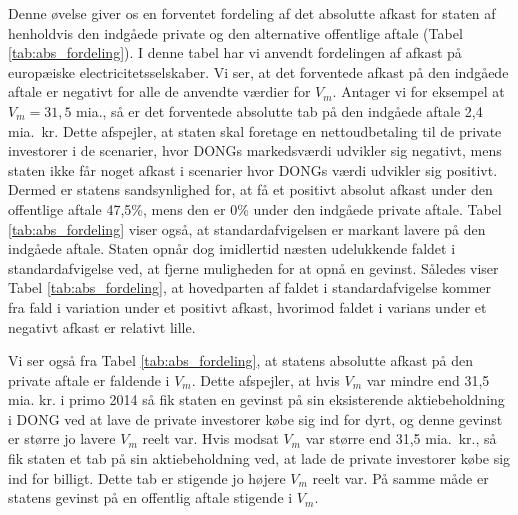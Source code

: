 \documentclass{article}
\begin{document}
Denne øvelse giver os en forventet fordeling af det absolutte afkast for staten af henholdvis den indgåede private og den alternative offentlige aftale (Tabel \ref{tab:abs_fordeling}). I denne tabel har vi anvendt fordelingen af afkast på europæiske electricitetsselskaber. Vi ser, at det forventede afkast på den indgåede aftale er negativt for alle de anvendte værdier for $V_m$. Antager vi for eksempel at $V_m=31{,}5$ mia., så er det forventede absolutte tab på den indgåede aftale 2,4 mia.\ kr. Dette afspejler, at staten skal foretage en nettoudbetaling til de private investorer i de scenarier, hvor DONGs markedsværdi udvikler sig negativt, mens staten ikke får noget afkast i scenarier hvor DONGs værdi udvikler sig positivt. Dermed er statens sandsynlighed for, at få et positivt absolut afkast under den offentlige aftale 47,5\%, mens den er 0\% under den indgåede private aftale. Tabel \ref{tab:abs_fordeling} viser også, at standardafvigelsen er markant lavere på den indgåede aftale. Staten opnår dog imidlertid næsten udelukkende faldet i standardafvigelse ved, at fjerne muligheden for at opnå en gevinst. Således viser Tabel \ref{tab:abs_fordeling}, at hovedparten af faldet i standardafvigelse kommer fra fald i variation under et positivt afkast, hvorimod faldet i varians under et negativt afkast er relativt lille.

Vi ser også fra Tabel \ref{tab:abs_fordeling}, at statens absolutte afkast på den private aftale er faldende i $V_m$. Dette afspejler, at hvis $V_m$ var mindre end 31,5 mia. kr. i primo 2014 så fik staten en gevinst på sin eksisterende aktiebeholdning i DONG ved at lave de private investorer købe sig ind for dyrt, og denne gevinst er større jo lavere $V_m$ reelt var. Hvis modsat $V_m$ var større end 31,5 mia.\ kr., så fik staten et tab på sin aktiebeholdning ved, at lade de private investorer købe sig ind for billigt. Dette tab er stigende jo højere $V_m$ reelt var. På samme måde er statens gevinst på en offentlig aftale stigende i $V_m$.
\end{document}
